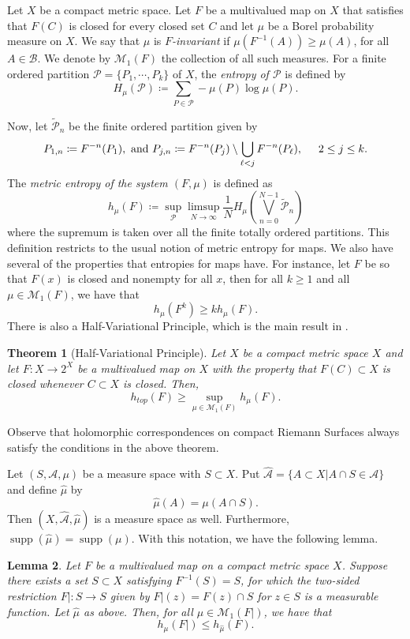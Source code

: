 \documentclass[11pt,letterpaper]{article}
\newtheorem{theorem}{Theorem}[section]
\newtheorem{lemma}[theorem]{Lemma}
\theoremstyle{definition}
\def\supp{\operatorname{supp}}
\begin{document}
Let $X$ be a compact metric space. Let $F$ be a multivalued map on $X$ that satisfies that $F(C)$ is closed for every closed set $C$ and let $\mu$ be a Borel probability measure on $X$. We say that $\mu$ is \emph{$F$-invariant} if $\mu(F^{-1}(A))\geq\mu(A)$, for all $A\in\mathcal{B}$. We denote by $\mathcal{M}_1(F)$ the collection of all such measures. For a finite ordered partition $\mathcal{P}=\lbrace P_1,\cdots,P_k\rbrace$ of $X$, the \emph{entropy of $\mathcal{P}$} is defined by
$$H_\mu(\mathcal{P})\coloneqq\sum\limits_{P\in\mathcal{P}}-\mu(P)\log\mu(P).$$

Now, let $\widetilde{\mathcal{P}}_n$ be the finite ordered partition given by
$$P_{1,n}\coloneqq F^{-n}(P_1),\mbox{ and }P_{j,n}\coloneqq F^{-n}(P_j)\setminus\bigcup\limits_{\ell<j}F^{-n}(P_{\ell}),\hspace{.5cm}2\leq j\leq k.$$
The \emph{metric entropy of the system $(F,\mu)$} is defined as
$$h_\mu(F)\coloneqq\sup\limits_{\mathcal{P}}\limsup_{N\to\infty}\frac{1}{N}H_{\mu}\left(\bigvee\limits_{n=0}^{N-1}\widetilde{\mathcal{P}}_n\right)$$
where the supremum is taken over all the finite totally ordered partitions. This definition restricts to the usual notion of metric entropy for maps. We also have several of the properties that entropies for maps have. For instance, let $F$ be so that $F(x)$ is closed and nonempty for all $x$, then for all $k\geq 1$ and all $\mu\in\mathcal{M}_1(F)$, we have that
$$h_{\mu}(F^k)\geq k h_{\mu}(F).$$
There is also a Half-Variational Principle, which is the main result in \cite{VivSir22}.

\begin{theorem}[Half-Variational Principle]
Let $X$ be a compact metric space $X$ and let $F:X\to 2^X$ be a multivalued map on $X$ with the property that $F(C)\subset X$ is closed whenever $C\subset X$ is closed. Then,
$$h_{top}(F)\geq\sup\limits_{\mu\in\mathcal{M}_1(F)}h_\mu(F).$$
\end{theorem}

Observe that holomorphic correspondences on compact Riemann Surfaces always satisfy the conditions in the above theorem.

Let $(S,\mathcal{A},\mu)$ be a measure space with $S\subset X$. Put $\hat{\mathcal{A}}=\lbrace A\subset X|A\cap S\in\mathcal{A}\rbrace$ and define $\hat{\mu}$ by
$$\hat{\mu}(A)=\mu(A\cap S).$$
Then $(X,\hat{\mathcal{A}},\hat{\mu})$ is a measure space as well. Furthermore, $\supp(\hat{\mu})=\supp(\mu)$. With this notation, we have the following lemma.

\begin{lemma}\label{restriction}
Let $F$ be a multivalued map on a compact metric space $X$. Suppose there exists a set $S\subset X$ satisfying $F^{-1}(S)= S$, for which the two-sided restriction $F|:S\to S$ given by $F|(z)=F(z)\cap S$ for $z\in S$ is a measurable function. Let $\hat{\mu}$ as above. Then, for all $\mu\in\mathcal{M}_1(F|)$, we have that
$$h_{\mu}(F|)\leq h_{\hat{\mu}}(F).$$
\end{lemma}
\end{document}
